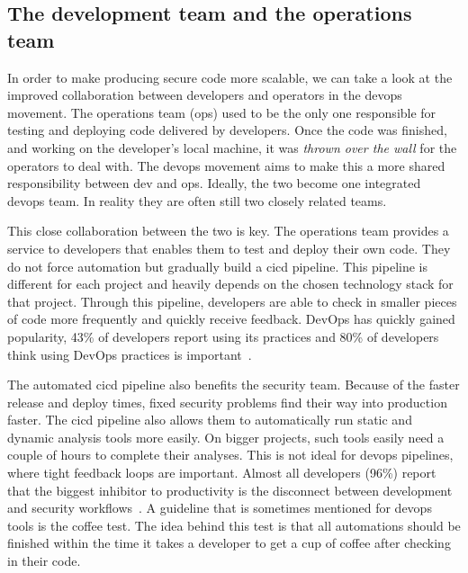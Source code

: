 \subsection{The development team and the operations team}
In order to make producing secure code more scalable, we can take a look at the improved collaboration between developers and operators in the \gls{devops} movement.
The operations team (\Gls{ops}) used to be the only one responsible for testing and deploying code delivered by developers.
Once the code was finished, and working on the developer's local machine, it was \textit{thrown over the wall} for the operators to deal with.
The \gls{devops} movement aims to make this a more shared responsibility between \gls{dev} and \gls{ops}.
Ideally, the two become one integrated \gls{devops} team. In reality they are often still two closely related teams. 

This close collaboration between the two is key.
The operations team provides a service to developers that enables them to test and deploy their own code. They do not force automation but gradually build a \gls{cicd} pipeline. This pipeline is different for each project and heavily depends on the chosen technology stack for that project.
Through this pipeline, developers are able to check in smaller pieces of code more frequently and quickly receive feedback. DevOps has quickly gained popularity, 43\% of developers report using its practices and 80\% of developers think using DevOps practices is important~\cite{stackoverflow2020}.

The automated \gls{cicd} pipeline also benefits the security team.
Because of the faster release and deploy times, fixed security problems find their way into production faster.
The \gls{cicd} pipeline also allows them to automatically run static and dynamic analysis tools more easily.
On bigger projects, such tools easily need a couple of hours to complete their analyses. This is not ideal for \gls{devops} pipelines, where tight feedback loops are important.
Almost all developers (96\%) report that the biggest inhibitor to productivity is the disconnect between development and security workflows~\cite{shiftleftsurvey}.
A guideline that is sometimes mentioned for \gls{devops} tools is the coffee test.
The idea behind this test is that all automations should be finished within the time it takes a developer to get a cup of coffee after checking in their code. 


